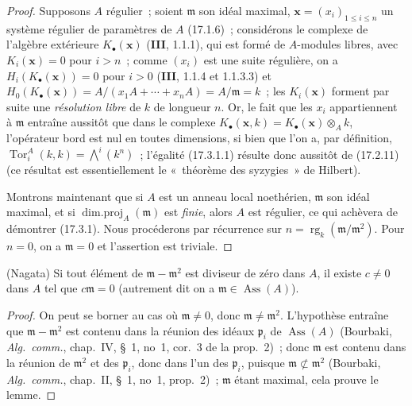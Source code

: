 \begin{proof}
Supposons $A$ régulier~; soient $\mathfrak{m}$ son idéal maximal,
$\mathbf{x}=(x_i)_{1\leq i\leq n}$ un système régulier de paramètres de $A$
(17.1.6)~; considérons le complexe de l'algèbre extérieure
$K_\bullet(\mathbf{x})$ (\textbf{III}, 1.1.1), qui est formé de $A$-modules
libres, avec $K_i(\mathbf{x})=0$ pour $i>n$~; comme $(x_i)$ est une suite
régulière, on a $H_i(K_\bullet(\mathbf{x}))=0$ pour $i>0$ (\textbf{III},
1.1.4 et 1.1.3.3) et
$H_0(K_\bullet(\mathbf{x}))=A/(x_1A+\cdots+x_nA)=A/\mathfrak{m}=k$~; les
$K_i(\mathbf{x})$ forment par suite une \emph{résolution libre} de $k$ de
longueur $n$. Or, le fait que les $x_i$ appartiennent à $\mathfrak{m}$
entraîne aussitôt que dans le complexe
$K_\bullet(\mathbf{x},k)=K_\bullet(\mathbf{x})\otimes_A k$, l'opérateur bord
est nul en toutes dimensions, si bien que l'on a, par définition,
$\operatorname{Tor}^A_i(k,k)=\bigwedge^i(k^n)$~; l'égalité (17.3.1.1) résulte
donc aussitôt de (17.2.11) (ce résultat est essentiellement le «~théorème des
syzygies~» de Hilbert).

Montrons maintenant que si $A$ est un anneau local noethérien,
$\mathfrak{m}$ son idéal maximal, et si
$\operatorname{dim.proj}_A(\mathfrak{m})$ est \emph{finie}, alors $A$ est
régulier, ce qui achèvera de démontrer (17.3.1). Nous procéderons par
récurrence sur $n=\operatorname{rg}_k(\mathfrak{m}/\mathfrak{m}^2)$. Pour
$n=0$, on a $\mathfrak{m}=0$ et l'assertion est triviale.
\end{proof}

\begin{lemma}[17.3.1.2]
\label{0.17.3.1.2-fr}
\textnormal{(Nagata)} Si tout élément de
$\mathfrak{m}-\mathfrak{m}^2$ est diviseur de zéro dans $A$, il existe
$c\neq0$ dans $A$ tel que $c\mathfrak{m}=0$ (autrement dit on a
$\mathfrak{m}\in\operatorname{Ass}(A)$).
\end{lemma}

\begin{proof}
On peut se borner au cas où $\mathfrak{m}\neq0$, donc
$\mathfrak{m}\neq\mathfrak{m}^2$. L'hypothèse entraîne que
$\mathfrak{m}-\mathfrak{m}^2$ est contenu dans la réunion des idéaux
$\mathfrak{p}_i$ de $\operatorname{Ass}(A)$ (Bourbaki,
\emph{Alg.~comm.}, chap.~IV, \S~1, no~1, cor.~3 de la prop.~2)~; donc
$\mathfrak{m}$ est contenu dans la réunion de $\mathfrak{m}^2$
et des $\mathfrak{p}_i$, donc dans l'un des $\mathfrak{p}_i$, puisque
$\mathfrak{m}\not\subset\mathfrak{m}^2$ (Bourbaki, \emph{Alg.~comm.},
chap.~II, \S~1, no~1, prop.~2)~; $\mathfrak{m}$ étant maximal, cela prouve le
lemme.
\end{proof}

